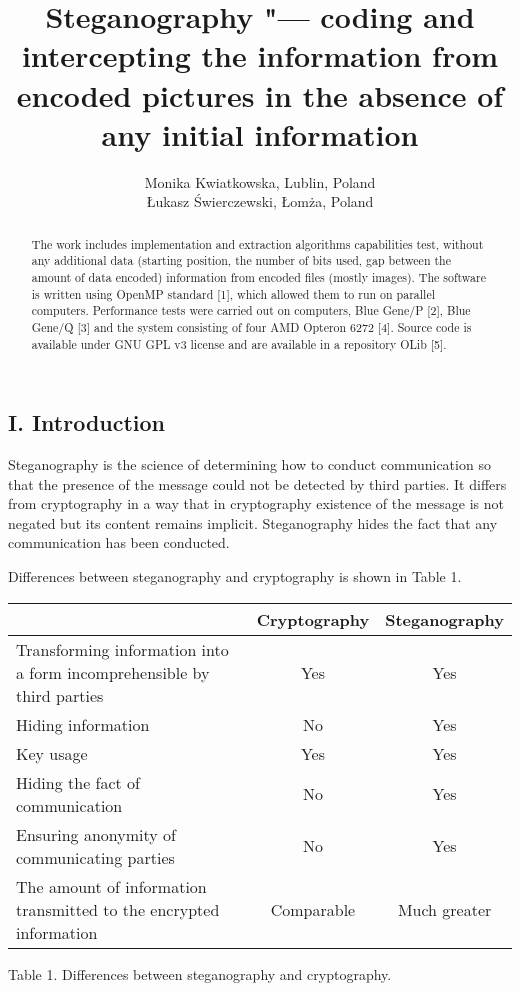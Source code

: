 \documentclass[10pt, a5paper]{article}
\begin{document}
\title{Steganography "--- coding and intercepting the information from encoded pictures in the absence of any initial information}
\author{Monika Kwiatkowska, Lublin, Poland\\ \L{}ukasz \'S{}wierczewski, \L{}om\.z{}a, Poland}
\maketitle
\begin{abstract}
The work includes implementation and extraction algorithms capabilities test, without any additional data (starting position, the number of bits used, gap between the amount of data encoded) information from encoded files (mostly images). The software is written using OpenMP standard [1], which allowed them to run on parallel computers. Performance tests were carried out on computers, Blue Gene/P [2], Blue Gene/Q [3] and the system consisting of four AMD Opteron 6272 [4]. Source code is available under GNU GPL v3 license and are available in a repository OLib [5].
\end{abstract}
\subsection*{I. Introduction}

Steganography is the science of determining how to conduct communication so that the presence of the message could not be detected by third parties. It differs from cryptography in a way that in cryptography existence of the message is not negated but its content remains implicit. Steganography hides the fact that any communication has been conducted.

Differences between steganography and cryptography is shown in Table 1.

\begin{center}
\begin{tabular}{P{13em}|c|c}
\hline
                                                                            & Cryptography & Steganography \\
\hline
Transforming information into a form in\-compre\-hensible by third parties  &     Yes      &     Yes       \\
Hiding information                                                          &     No       &     Yes       \\
Key usage                                                                   &     Yes      &     Yes       \\
Hiding the fact of commu\-ni\-ca\-tion                                      &     No       &     Yes       \\
Ensuring anonymity of commu\-ni\-ca\-ting parties                           &     No       &     Yes       \\
The amount of information transmitted to the encrypted information          &  Comparable  &  Much greater \\
\hline
\end{tabular}

Table 1. Differences between steganography and cryptography.
\end{center}
\end{document}

